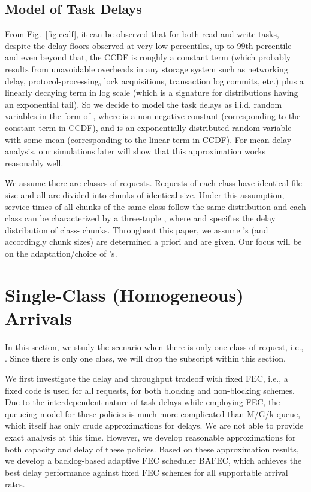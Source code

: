 \documentclass[journal]{IEEEtran}
\newcommand{\nonBlocking}{{BAFEC}\xspace}
\begin{document}
\subsection{Model of Task Delays}
\label{ssec:model:delay}
From Fig.~\ref{fig:ccdf}, it can be observed that for both read and write tasks, despite the delay floors observed at very low percentiles,  up to 99th percentile and even beyond that, 
the CCDF is roughly a constant term (which probably results from unavoidable overheads in any storage system such as networking delay, protocol-processing, lock acquisitions, transaction log commits, etc.) plus a linearly decaying term in log scale (which is a signature for distributions having an exponential tail). 
So we decide to model the task delays as i.i.d. random variables in the form of , where  is a non-negative constant (corresponding to the constant term in CCDF), and  is an exponentially distributed random variable with some mean  (corresponding to the linear term in CCDF). 
For mean delay analysis, our simulations later will show that this approximation works reasonably well.

We assume there are  classes of requests. Requests of each class have identical file size  and all are divided into chunks of identical size. Under this assumption, service times of all chunks of the same class follow the same distribution and each class  can be characterized by a three-tuple , where  and  specifies the delay distribution of class- chunks.
Throughout this paper, we assume 's (and accordingly chunk sizes) are determined a priori and  are given. Our focus will be on the adaptation/choice of 's.  


\newcommand{\appxC}{\tilde{C}}
\newcommand{\appxD}{\tilde{D}}

\section{Single-Class (Homogeneous) Arrivals}
\label{sec:singletype}
In this section, we study the scenario when there is only one class of request, i.e., . Since there is only one class, we will drop the subscript  within this section.

We first investigate the delay and throughput tradeoff with fixed FEC, i.e., a fixed  code is used for all requests, for both blocking and non-blocking schemes. Due to the interdependent nature of task delays while employing FEC, the queueing model for these policies is much more complicated than M/G/k queue, which itself has only crude approximations for delays. We are not able to provide exact analysis at this time. However, we develop reasonable approximations for both capacity and delay of these policies. Based on these approximation results, we develop a backlog-based adaptive FEC scheduler \nonBlocking, which achieves the best delay performance against fixed FEC schemes for all supportable arrival rates. 
\end{document}
